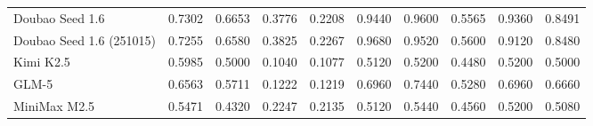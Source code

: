 \begin{table}[ht]
\begin{tabular}{l|cc|cc|ccccc}
Doubao Seed 1.6 & 0.7302 & 0.6653 & 0.3776 & 0.2208 & 0.9440 & 0.9600 & 0.5565 & 0.9360 & 0.8491 \\
Doubao Seed 1.6 (251015) & 0.7255 & 0.6580 & 0.3825 & 0.2267 & 0.9680 & 0.9520 & 0.5600 & 0.9120 & 0.8480 \\
Kimi K2.5 & 0.5985 & 0.5000 & 0.1040 & 0.1077 & 0.5120 & 0.5200 & 0.4480 & 0.5200 & 0.5000 \\
GLM-5 & 0.6563 & 0.5711 & 0.1222 & 0.1219 & 0.6960 & 0.7440 & 0.5280 & 0.6960 & 0.6660 \\
MiniMax M2.5 & 0.5471 & 0.4320 & 0.2247 & 0.2135 & 0.5120 & 0.5440 & 0.4560 & 0.5200 & 0.5080 \\
\bottomrule
\end{tabular}
\end{table}